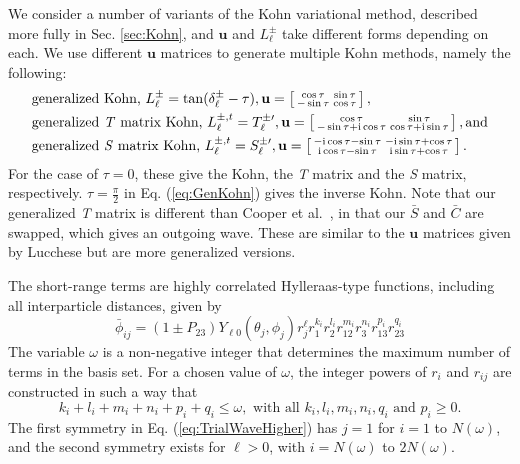 \documentclass[preprint,showpacs,preprintnumbers,amsmath,amssymb]{revtex4}
\newcommand{\ii}{{\rm{i}}}
\begin{document}
We consider a number of variants of the Kohn variational method, described more fully in Sec. \ref{sec:Kohn}, and $\textbf{u}$ and $L^{\pm}_\ell$ take different forms depending on each. We use different $\textbf{u}$ matrices to generate multiple Kohn methods, namely the following:
\begin{subequations}
\begin{align}
&\text{generalized Kohn, } L^{\pm}_\ell = \tan(\delta^{\pm}_\ell-\tau), \textbf{u} = \left[ \begin{smallmatrix}
\cos \tau & \sin \tau \\  -\sin \tau & \cos \tau
\end{smallmatrix} \right], \label{eq:GenKohn}\\
&\text{generalized \emph{T} matrix Kohn, } L^{\pm,t}_\ell = T_\ell^{\pm\prime}, \textbf{u} = \left[ \begin{smallmatrix}
\cos\tau & \sin\tau \\ -\sin\tau + \ii \cos\tau & \cos\tau + \ii \sin\tau
\end{smallmatrix} \right], \text{and}\label{eq:GenTKohn} \\
&\text{generalized \emph{S} matrix Kohn, } L^{\pm,t}_\ell = S_\ell^{\pm\prime}, \textbf{u} = \left[ \begin{smallmatrix}
-\ii \cos\tau - \sin\tau & -\ii\sin\tau + \cos\tau \\ \ii\cos\tau - \sin\tau & \ii\sin\tau + \cos\tau
\end{smallmatrix} \right]. \label{eq:GenSKohn}
\end{align}
\end{subequations}
For the case of $\tau = 0$, these give the Kohn, the \emph{T} matrix and the \emph{S} matrix, respectively. $\tau = \frac{\pi}{2}$ in Eq. (\ref{eq:GenKohn}) gives the inverse Kohn. Note that our generalized \emph{T} matrix is different than Cooper et al.\ \cite{Cooper2010}, in that our $\bar{S}$ and $\bar{C}$ are swapped, which gives an outgoing wave. These are similar to the $\textbf{u}$ matrices given by Lucchese \cite{Lucchese1989} but are more generalized versions.

The short-range terms are highly correlated Hylleraas-type functions, including all interparticle distances, given by
\begin{equation}
\label{eq:PhiDef}
\bar{\phi}_{ij} = \left(1 \pm P_{23}\right) Y_{\ell 0}(\theta_j,\phi_j) r_j^{\ell} r_1^{k_i} r_2^{l_i} r_{12}^{m_i} r_3^{n_i} r_{13}^{p_i} r_{23}^{q_i}
\end{equation}
The variable $\omega$ is a non-negative integer that determines the maximum number of terms in the basis set. For a chosen value of $\omega$, the integer powers of $r_i$ and $r_{ij}$ are constructed in such a way that 
\begin{equation}
k_i + l_i + m_i + n_i + p_i + q_i \leq \omega, \text{ with all } k_i, l_i, m_i, n_i, q_i \text{ and } p_i \geq 0.\end{equation}
The first symmetry in Eq. (\ref{eq:TrialWaveHigher}) has $j=1$ for $i=1$ to $N(\omega)$, and the second symmetry exists for $\ell > 0$, with $i = N(\omega)$ to $2N(\omega)$.
\end{document}

